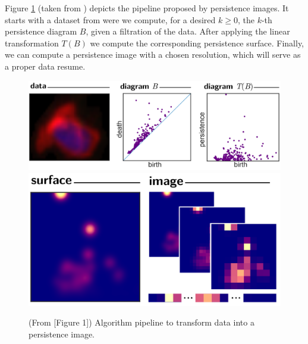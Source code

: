 \begin{example}
    Figure \ref{fig:persistent-images} (taken from \cite{adams}) depicts the pipeline proposed by persistence images. It starts with a dataset from were we compute, for a desired $k \geq 0 $, the $k$-th persistence diagram $ B $, given a filtration of the data. After applying the linear transformation $T(B)$ we compute the corresponding persistence surface. Finally, we can compute a persistence image with a chosen resolution, which will serve as a proper data resume.        
    \begin{figure}[H]
        \centering
        \includegraphics[width=\linewidth]{figures/persistence-images-1.png}
        \includegraphics[width=0.66\linewidth]{figures/persistence-images-2.png}
        \caption[Persistence images pipeline]{(From \cite{adams}[Figure 1]) Algorithm pipeline to transform data into a persistence image.}
        \label{fig:persistent-images}
    \end{figure}
\end{example}

